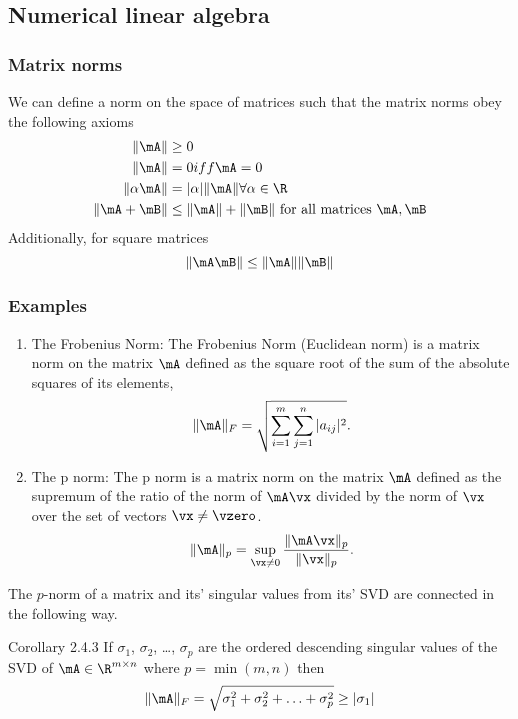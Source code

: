 \subsection{Numerical linear algebra}
\subsubsection{Matrix norms}
We can define a norm on the space of matrices such that the matrix norms obey the following axioms
\begin{align*}
	\|\mA\|        & \geq 0                                                   \\
	\|\mA\|        & = 0 iff \mA = 0                                          \\
	\|\alpha \mA\| & = |\alpha| \|\mA\| \forall \alpha \in \R                 \\
	\|\mA + \mB\|  & \leq \|\mA\| + \|\mB\|\text{ for all matrices } \mA, \mB 
\end{align*}
Additionally, for square matrices
\[
	\|\mA\mB\| \leq \|\mA\| \|\mB\|
\]
\subsubsection{Examples}

\begin{enumerate}
	\item{The Frobenius Norm:}
	The Frobenius Norm (Euclidean norm) is a matrix norm on the matrix $\mA$ defined as the square root of the sum
	of the absolute squares of its elements,
	\[
		\|\mA\|_F = \sqrt{\sum_{i=1}^m \sum_{j=1}^n |a_{ij}|^2}.
	\]
	
	\item{The p norm:}
	The p norm is a matrix norm on the matrix $\mA$ defined as the supremum of the ratio of the norm of
	$\mA \vx$ divided by the norm of $\vx$ over the set of vectors $\vx \ne \vzero$.
	\[
		\|\mA\|_p = \sup_{\vx \ne 0} \frac{\|\mA \vx\|_p}{\|\vx\|_p}.
	\]
\end{enumerate}

The $p$-norm of a matrix and its' singular values from its' SVD are connected in the following way.

\cite{Golub:1996:MC:248979} Corollary 2.4.3 %
If $\sigma_1$, $\sigma_2$, \ldots, $\sigma_p$ are the ordered descending singular values of the SVD of $\mA
\in \R^{m \times n}$ where $p = \min{(m, n)}$ then
\[
	\|\mA\|_F = \sqrt{\sigma_1^2 + \sigma_2^2 + \ldots + \sigma_p^2} \geq |\sigma_1|
\]

